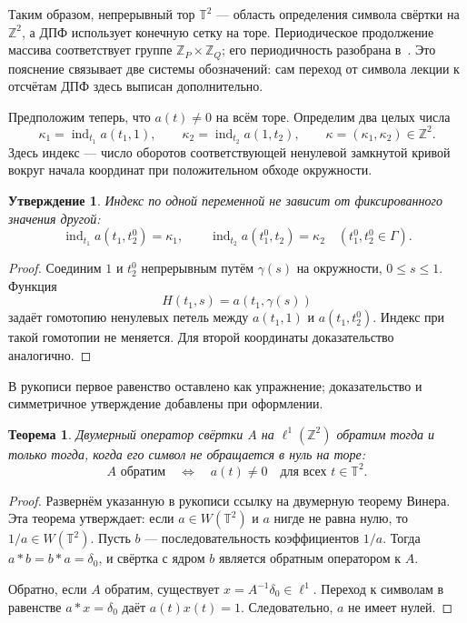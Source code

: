 \documentclass[12pt,a4paper]{article}
\newtheorem{theorem}{Теорема}
\newtheorem{proposition}{Утверждение}
\theoremstyle{definition}
\theoremstyle{remark}
\newcommand{\ZZ}{\mathbb{Z}}
\DeclareMathOperator{\ind}{ind}
\newcommand{\TT}{\mathbb T}
\begin{document}
Таким образом, непрерывный тор $\TT^2$ --- область определения
символа свёртки на $\ZZ^2$, а ДПФ использует конечную сетку на торе.
Периодическое продолжение массива соответствует группе
$\ZZ_P\times\ZZ_Q$; его периодичность разобрана
в~\cite[\S\,4.6.3, с.~285--287]{GW2012}.
Это пояснение связывает две системы обозначений: сам переход
от символа лекции к отсчётам ДПФ здесь выписан дополнительно.

Предположим теперь, что $a(t)\ne0$ на всём торе.
Определим два целых числа
\[
  \kappa_1=\ind_{t_1}a(t_1,1),\qquad
  \kappa_2=\ind_{t_2}a(1,t_2),\qquad
  \kappa=(\kappa_1,\kappa_2)\in\ZZ^2.
\]
Здесь индекс --- число оборотов соответствующей ненулевой
замкнутой кривой вокруг начала координат при положительном
обходе окружности.

\begin{proposition}
Индекс по одной переменной не зависит от фиксированного значения другой:
\[
  \ind_{t_1}a(t_1,t_2^0)=\kappa_1,\qquad
  \ind_{t_2}a(t_1^0,t_2)=\kappa_2
  \quad(t_1^0,t_2^0\in\Gamma).
\]
\end{proposition}

\begin{proof}
Соединим $1$ и $t_2^0$ непрерывным путём $\gamma(s)$ на окружности,
$0\leqslant s\leqslant1$. Функция
\[
  H(t_1,s)=a(t_1,\gamma(s))
\]
задаёт гомотопию ненулевых петель между $a(t_1,1)$ и $a(t_1,t_2^0)$.
Индекс при такой гомотопии не меняется. Для второй координаты
доказательство аналогично.
\end{proof}
В рукописи первое равенство оставлено как упражнение;
доказательство и симметричное утверждение добавлены при оформлении.

\begin{theorem}
Двумерный оператор свёртки $A$ на $\ell^1(\ZZ^2)$ обратим
тогда и только тогда, когда его символ не обращается в нуль на торе:
\[
  \boxed{A\text{ обратим}\quad\Longleftrightarrow\quad
  a(t)\ne0\quad\text{для всех }t\in\TT^2}.
\]
\end{theorem}

\begin{proof}
Развернём указанную в рукописи ссылку на двумерную теорему Винера.
Эта теорема утверждает: если $a\in W(\TT^2)$ и $a$ нигде не равна
нулю, то $1/a\in W(\TT^2)$. Пусть $b$ --- последовательность
коэффициентов $1/a$. Тогда $a*b=b*a=\delta_0$, и свёртка с ядром
$b$ является обратным оператором к $A$.

Обратно, если $A$ обратим, существует $x=A^{-1}\delta_0\in\ell^1$.
Переход к символам в равенстве $a*x=\delta_0$ даёт
$a(t)x(t)=1$. Следовательно, $a$ не имеет нулей.
\end{proof}
\end{document}
